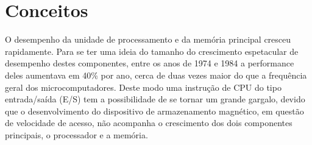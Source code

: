 
		\section{Conceitos}
		O desempenho da unidade de processamento e da memória principal cresceu rapidamente. Para se ter uma ideia do tamanho do crescimento espetacular de desempenho destes componentes, entre os anos de 1974 e 1984 a performance deles aumentava em 40\% por ano, cerca de duas vezes maior do que a frequência geral dos microcomputadores. Deste modo uma instrução de CPU do tipo entrada/saída (E/S) tem a possibilidade de se tornar um grande gargalo, devido que o desenvolvimento do dispositivo de armazenamento magnético, em questão de velocidade de acesso, não acompanha o crescimento dos dois componentes principais, o processador e a memória.\\
		
